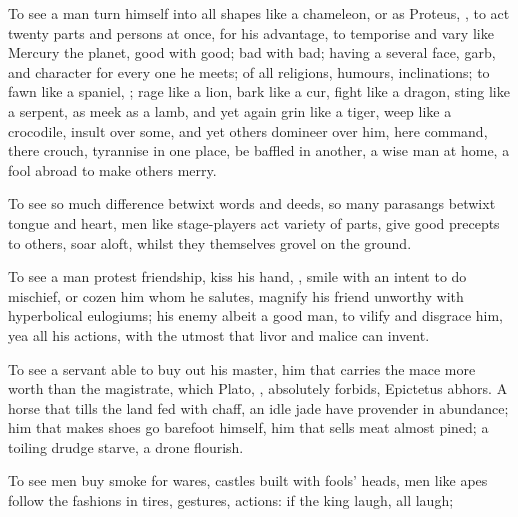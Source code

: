 To see a man turn himself into all shapes like a chameleon, or as Proteus,
, to act twenty parts and persons
at once, for his advantage, to temporise and vary like Mercury the planet, good
with good; bad with bad; having a several face, garb, and character for every
one he meets; of all religions, humours, inclinations; to fawn like a spaniel,
; rage like a lion, bark like a cur, fight
like a dragon, sting like a serpent, as meek as a lamb, and yet again grin like
a tiger, weep like a crocodile, insult over some, and yet others domineer over
him, here command, there crouch, tyrannise in one place, be baffled in another,
a wise man at home, a fool abroad to make others merry.

To see so much difference betwixt words and deeds, so many parasangs betwixt
tongue and heart, men like stage-players act variety of parts,
give good precepts to others, soar aloft, whilst they
themselves grovel on the ground.

To see a man protest friendship, kiss his hand, , smile with an intent to do
mischief, or cozen him whom he salutes, magnify his friend
unworthy with hyperbolical eulogiums; his enemy albeit a good man, to vilify
and disgrace him, yea all his actions, with the utmost that livor and malice
can invent.

To see a servant able to buy out his master, him that
carries the mace more worth than the magistrate, which Plato,
, absolutely forbids, Epictetus abhors.
A horse that tills the land fed with chaff, an idle jade
have provender in abundance; him that makes shoes go barefoot himself, him that
sells meat almost pined; a toiling drudge starve, a drone flourish.

To see men buy smoke for wares, castles built with fools' heads, men like apes
follow the fashions in tires, gestures, actions: if the king laugh, all laugh;


